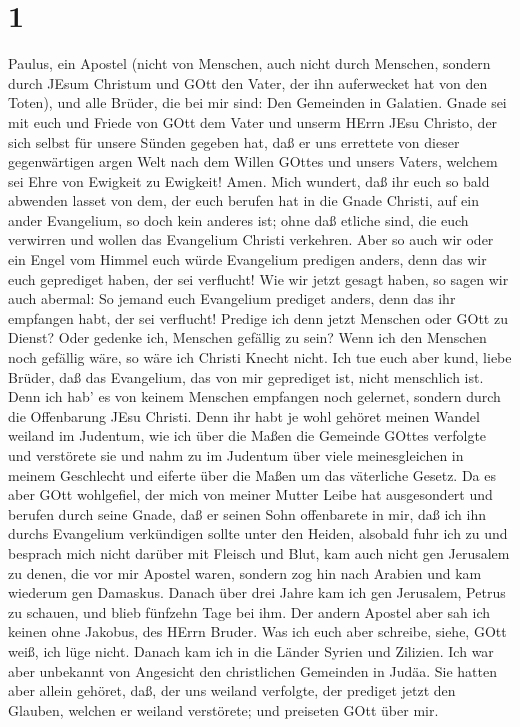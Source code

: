 \hypertarget{section}{%
\section{1}\label{section}}

 Paulus, ein Apostel (nicht von Menschen, auch nicht durch
Menschen, sondern durch JEsum Christum und GOtt den Vater, der ihn
auferwecket hat von den Toten), und alle Brüder, die bei mir
sind: Den Gemeinden in Galatien.  Gnade sei mit euch und
Friede von GOtt dem Vater und unserm HErrn JEsu Christo, 
der sich selbst für unsere Sünden gegeben hat, daß er uns errettete von
dieser gegenwärtigen argen Welt nach dem Willen GOttes und unsers
Vaters,  welchem sei Ehre von Ewigkeit zu Ewigkeit! Amen.
 Mich wundert, daß ihr euch so bald abwenden lasset von dem,
der euch berufen hat in die Gnade Christi, auf ein ander Evangelium,
 so doch kein anderes ist; ohne daß etliche sind, die euch
verwirren und wollen das Evangelium Christi verkehren.  Aber
so auch wir oder ein Engel vom Himmel euch würde Evangelium predigen
anders, denn das wir euch geprediget haben, der sei verflucht!
 Wie wir jetzt gesagt haben, so sagen wir auch abermal: So
jemand euch Evangelium prediget anders, denn das ihr empfangen habt, der
sei verflucht!  Predige ich denn jetzt Menschen oder GOtt zu
Dienst? Oder gedenke ich, Menschen gefällig zu sein? Wenn ich den
Menschen noch gefällig wäre, so wäre ich Christi Knecht nicht.
 Ich tue euch aber kund, liebe Brüder, daß das Evangelium,
das von mir geprediget ist, nicht menschlich ist.  Denn ich
hab' es von keinem Menschen empfangen noch gelernet, sondern durch die
Offenbarung JEsu Christi.  Denn ihr habt je wohl gehöret
meinen Wandel weiland im Judentum, wie ich über die Maßen die Gemeinde
GOttes verfolgte und verstörete sie  und nahm zu im
Judentum über viele meinesgleichen in meinem Geschlecht und eiferte über
die Maßen um das väterliche Gesetz.  Da es aber GOtt
wohlgefiel, der mich von meiner Mutter Leibe hat ausgesondert und
berufen durch seine Gnade,  daß er seinen Sohn offenbarete
in mir, daß ich ihn durchs Evangelium verkündigen sollte unter den
Heiden, alsobald fuhr ich zu und besprach mich nicht darüber mit Fleisch
und Blut,  kam auch nicht gen Jerusalem zu denen, die vor
mir Apostel waren, sondern zog hin nach Arabien und kam wiederum gen
Damaskus.  Danach über drei Jahre kam ich gen Jerusalem,
Petrus zu schauen, und blieb fünfzehn Tage bei ihm.  Der
andern Apostel aber sah ich keinen ohne Jakobus, des HErrn Bruder.
 Was ich euch aber schreibe, siehe, GOtt weiß, ich lüge
nicht.  Danach kam ich in die Länder Syrien und Zilizien.
 Ich war aber unbekannt von Angesicht den christlichen
Gemeinden in Judäa.  Sie hatten aber allein gehöret, daß,
der uns weiland verfolgte, der prediget jetzt den Glauben, welchen er
weiland verstörete;  und preiseten GOtt über mir.

